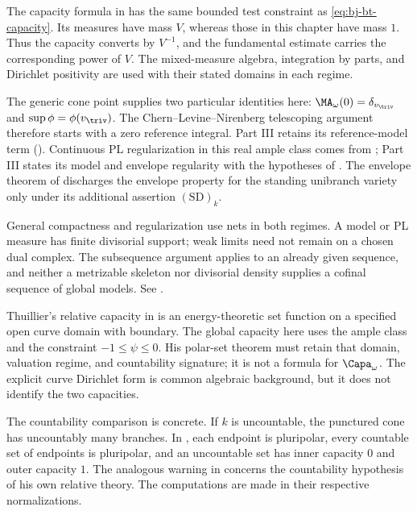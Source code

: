 The capacity formula in  has the same bounded
test constraint as \eqref{eq:bj-bt-capacity}. Its measures have mass $V$,
whereas those in this chapter have mass $1$. Thus the capacity converts
by $V^{-1}$, and the fundamental estimate carries the corresponding
power of $V$. The mixed-measure algebra, integration by parts, and
Dirichlet positivity are used with their stated domains in each regime.

The generic cone point supplies two particular identities here:
$\MA_\omega(0)=\delta_{v_{\triv}}$ and
$\sup\phi=\phi(v_{\triv})$.
The Chern--Levine--Nirenberg telescoping argument therefore starts with a
zero reference integral. Part III retains its reference-model term
().
Continuous PL regularization in this real ample class comes from
; Part III states its model and envelope
regularity with the hypotheses of
.
The envelope theorem of
discharges the envelope property for the standing unibranch variety only
under its additional assertion $\mathrm{(SD)}_k$.

General compactness and regularization use nets in both regimes.
A model or PL measure has finite divisorial support; weak limits need
not remain on a chosen dual complex. The subsequence argument applies
to an already given sequence, and neither a metrizable skeleton nor
divisorial density supplies a cofinal sequence of global models.
See .

Thuillier's relative capacity in  is an
energy-theoretic set function on a specified open curve domain with
boundary. The global capacity here uses the ample class and the
constraint $-1\le\psi\le0$. His polar-set theorem
 must retain that domain, valuation
regime, and countability signature; it is not a formula for
$\Capa_\omega$. The explicit curve Dirichlet form is common algebraic
background, but it does not identify the two capacities.

The countability comparison is concrete. If $k$ is uncountable, the
punctured cone has uncountably many branches. In
, each endpoint is pluripolar,
every countable set of endpoints is pluripolar, and an uncountable set
has inner capacity $0$ and outer capacity $1$.
The analogous warning in \cite[Remarque~3.6.12]{Thu05} concerns the
countability hypothesis of his own relative theory. The computations
are made in their respective normalizations.

